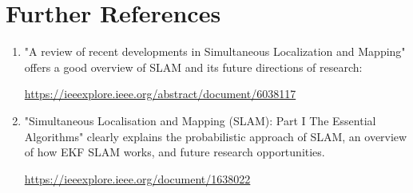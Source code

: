 \section{Further References}

\begin{enumerate}
    \item "A review of recent developments in Simultaneous Localization and Mapping" offers a good overview of SLAM and its future directions of research: 
    
    \href{url}{https://ieeexplore.ieee.org/abstract/document/6038117}
    
    \item "Simultaneous Localisation and Mapping (SLAM): Part I The Essential Algorithms" clearly explains the probabilistic approach of SLAM, an overview of how EKF SLAM works, and future research opportunities.

    \href{url}{https://ieeexplore.ieee.org/document/1638022}
\end{enumerate}




